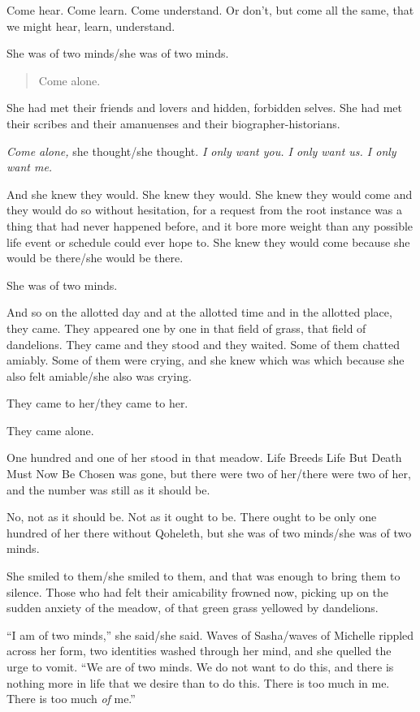 Come hear. Come learn. Come understand. Or don't, but come all the same, that we might hear, learn, understand.

She was of two minds/she was of two minds.

\begin{quote}
Come alone.
\end{quote}

She had met their friends and lovers and hidden, forbidden selves. She had met their scribes and their amanuenses and their biographer-historians.

\emph{Come alone,} she thought/she thought. \emph{I only want you. I only want us. I only want me.}

And she knew they would. She knew they would. She knew they would come and they would do so without hesitation, for a request from the root instance was a thing that had never happened before, and it bore more weight than any possible life event or schedule could ever hope to. She knew they would come because she would be there/she would be there.

She was of two minds.

And so on the allotted day and at the allotted time and in the allotted place, they came. They appeared one by one in that field of grass, that field of dandelions. They came and they stood and they waited. Some of them chatted amiably. Some of them were crying, and she knew which was which because she also felt amiable/she also was crying.

They came to her/they came to her.

They came alone.

One hundred and one of her stood in that meadow. Life Breeds Life But Death Must Now Be Chosen was gone, but there were two of her/there were two of her, and the number was still as it should be.

No, not as it should be. Not as it ought to be. There ought to be only one hundred of her there without Qoheleth, but she was of two minds/she was of two minds.

She smiled to them/she smiled to them, and that was enough to bring them to silence. Those who had felt their amicability frowned now, picking up on the sudden anxiety of the meadow, of that green grass yellowed by dandelions.

``I am of two minds,'' she said/she said. Waves of Sasha/waves of Michelle rippled across her form, two identities washed through her mind, and she quelled the urge to vomit. ``We are of two minds. We do not want to do this, and there is nothing more in life that we desire than to do this. There is too much in me. There is too much \emph{of} me.''

